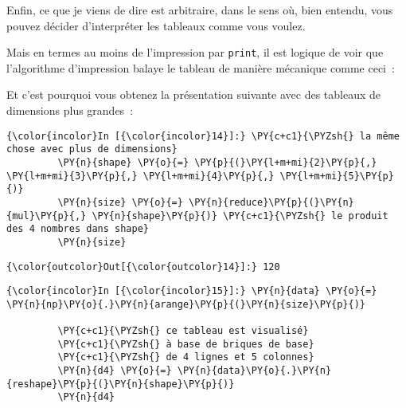     Enfin, ce que je viens de dire est arbitraire, dans le sens où, bien
entendu, vous pouvez décider d'interpréter les tableaux comme vous
voulez.

Mais en termes au moins de l'impression par \texttt{print}, il est
logique de voir que l'algorithme d'impression balaye le tableau de
manière mécanique comme ceci~:

\begin{Shaded}
\begin{Highlighting}[]
 \NormalTok{(}\NormalTok{):}
     \NormalTok{(}\NormalTok{):}
         \NormalTok{(}\NormalTok{):}
\end{Highlighting}
\end{Shaded}

    Et c'est pourquoi vous obtenez la présentation suivante avec des
tableaux de dimensions plus grandes~:

    \begin{Verbatim}[commandchars=\\\{\}]
{\color{incolor}In [{\color{incolor}14}]:} \PY{c+c1}{\PYZsh{} la même chose avec plus de dimensions}
         \PY{n}{shape} \PY{o}{=} \PY{p}{(}\PY{l+m+mi}{2}\PY{p}{,} \PY{l+m+mi}{3}\PY{p}{,} \PY{l+m+mi}{4}\PY{p}{,} \PY{l+m+mi}{5}\PY{p}{)}
         \PY{n}{size} \PY{o}{=} \PY{n}{reduce}\PY{p}{(}\PY{n}{mul}\PY{p}{,} \PY{n}{shape}\PY{p}{)} \PY{c+c1}{\PYZsh{} le produit des 4 nombres dans shape}
         \PY{n}{size}
\end{Verbatim}


\begin{Verbatim}[commandchars=\\\{\}]
{\color{outcolor}Out[{\color{outcolor}14}]:} 120
\end{Verbatim}
            
    \begin{Verbatim}[commandchars=\\\{\}]
{\color{incolor}In [{\color{incolor}15}]:} \PY{n}{data} \PY{o}{=} \PY{n}{np}\PY{o}{.}\PY{n}{arange}\PY{p}{(}\PY{n}{size}\PY{p}{)}
         
         \PY{c+c1}{\PYZsh{} ce tableau est visualisé}
         \PY{c+c1}{\PYZsh{} à base de briques de base}
         \PY{c+c1}{\PYZsh{} de 4 lignes et 5 colonnes}
         \PY{n}{d4} \PY{o}{=} \PY{n}{data}\PY{o}{.}\PY{n}{reshape}\PY{p}{(}\PY{n}{shape}\PY{p}{)}
         \PY{n}{d4}
\end{Verbatim}


